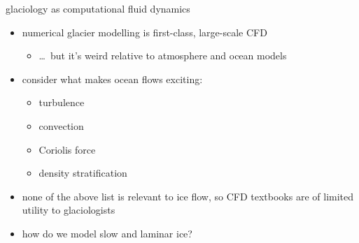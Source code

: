 \documentclass[10pt,dvipsnames]{beamer}
\begin{document}
\begin{frame}{glaciology as computational fluid dynamics}

\begin{itemize}
\item numerical glacier modelling is first-class, large-scale CFD
  \begin{itemize}
  \item[$\circ$] \dots\, but it's weird relative to atmosphere and ocean models
  \end{itemize}
\item consider what makes ocean flows exciting:
  \begin{itemize}
  \item[$\circ$] turbulence
  \item[$\circ$] convection
  \item[$\circ$] Coriolis force
  \item[$\circ$] density stratification
  \end{itemize}
\item none of the above list is relevant to ice flow, so CFD textbooks are of limited utility to glaciologists
\item how do we model slow and laminar ice?
\end{itemize}
\end{frame}
\end{document}
